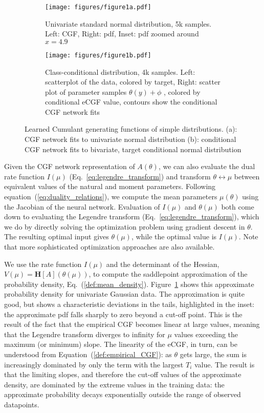\documentclass{article}      %
\begin{document}
\begin{figure}[tb]
  \centering
  \begin{subfigure}[t]{0.5\textwidth}
    \centering
    \texttt{[image: figures/figure1a.pdf]}
    \caption{Univariate standard normal distribution, 5k samples. Left: CGF, Right: pdf, Inset: pdf zoomed around $x=4.9$}
    \label{fig:1a_CGF_Normal}
  \end{subfigure}
  \begin{subfigure}[t]{0.5\textwidth}
    \centering
    \texttt{[image: figures/figure1b.pdf]}
    \caption{Class-conditional distribution, 4k samples. Left: scatterplot of the data, colored by target, Right: scatter plot of parameter samples $\theta(y) + \phi$ , colored by conditional eCGF value, contours show the conditional CGF network fits}
    \label{fig:1b_conditional_CGF}
  \end{subfigure}

  \caption{Learned Cumulant generating functions of simple distributions. (a): CGF network fits to univariate normal distribution (b): conditional CGF network fits to bivariate, target conditional normal distribution}
  \label{fig:1_CGF}
\end{figure}


Given the CGF network representation of $A(\theta)$, we can also evaluate the dual rate function $I(\mu)$ (Eq.~\ref{eq:legendre_transform}) and transform $\theta \leftrightarrow \mu$ between equivalent values of the natural and moment parameters.
Following equation~(\ref{eq:duality_relations}), we compute the mean parameters $\mu(\theta)$ using the Jacobian of the neural network. 
Evaluation of $I(\mu)$ and $\theta(\mu)$ both come down to evaluating the Legendre transform (Eq.~\ref{eq:legendre_transform}), which we do by directly solving the optimization problem using gradient descent in $\theta$.
The resulting optimal input gives $\theta(\mu)$, while the optimal value is $I(\mu)$.
Note that more sophisticated optimization approaches are also available.

We use the rate function $I(\mu)$ and the determinant of the Hessian, ${V(\mu) = \bm{H}[A](\theta(\mu))}$, to compute the saddlepoint approximation of the probability density, Eq.~(\ref{def:mean_density}).
Figure~\ref{fig:1a_CGF_Normal} shows this approximate probability density for univariate Gaussian data.
The approximation is quite good, but shows a characteristic deviations in the tails, highlighted in the inset:
the approximate pdf falls sharply to zero beyond a cut-off point. 
This is the result of the fact that the empirical CGF becomes linear at large values, meaning that the Legendre transform diverges to infinity for $\mu$ values exceeding the maximum (or minimum) slope.
The linearity of the eCGF, in turn, can be understood from Equation~(\ref{def:empirical_CGF}): as $\theta$ gets large, the sum is increasingly dominated by only the term with the largest $T_i$ value.
The result is that the limiting slopes, and therefore the cut-off values of the approximate density, are dominated by the extreme values in the training data: the approximate probability decays exponentially outside the range of observed datapoints.
\end{document}
